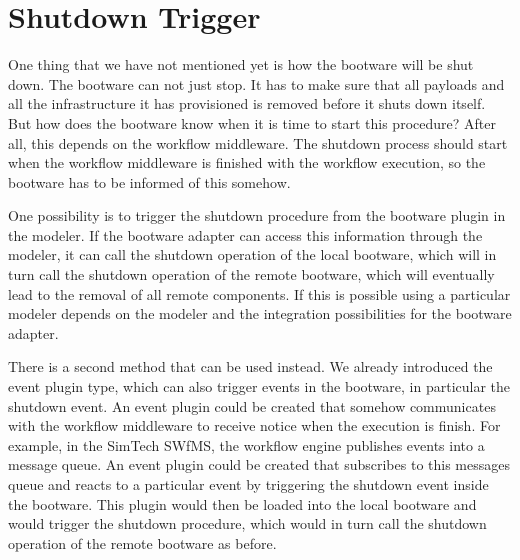 \section{Shutdown Trigger}
\label{design:shutdown}

One thing that we have not mentioned yet is how the bootware will be shut down.
The bootware can not just stop.
It has to make sure that all payloads and all the infrastructure it has provisioned is removed before it shuts down itself.
But how does the bootware know when it is time to start this procedure?
After all, this depends on the workflow middleware.
The shutdown process should start when the workflow middleware is finished with the workflow execution, so the bootware has to be informed of this somehow.

One possibility is to trigger the shutdown procedure from the bootware plugin in the modeler.
If the bootware adapter can access this information through the modeler, it can call the shutdown operation of the local bootware, which will in turn call the shutdown operation of the remote bootware, which will eventually lead to the removal of all remote components.
If this is possible using a particular modeler depends on the modeler and the integration possibilities for the bootware adapter.

There is a second method that can be used instead.
We already introduced the event plugin type, which can also trigger events in the bootware, in particular the shutdown event.
An event plugin could be created that somehow communicates with the workflow middleware to receive notice when the execution is finish.
For example, in the SimTech SWfMS, the workflow engine publishes events into a message queue.
An event plugin could be created that subscribes to this messages queue and reacts to a particular event by triggering the shutdown event inside the bootware.
This plugin would then be loaded into the local bootware and would trigger the shutdown procedure, which would in turn call the shutdown operation of the remote bootware as before.
